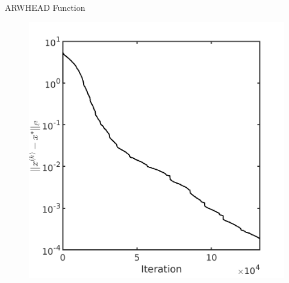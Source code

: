 \documentclass{beamer}
\begin{document}
\begin{frame}{ARWHEAD Function}
\begin{figure}[!htbp]
	  \includegraphics[scale=0.2]{./figures/arwhead640D_dist.png}
\end{figure}
\end{frame}
\end{document}
